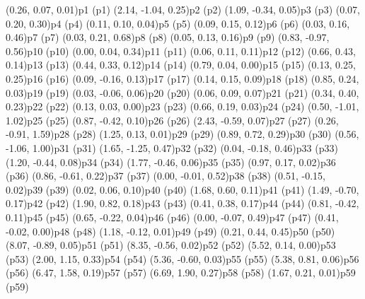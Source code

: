 \psPoint(0.26, 0.07, 0.01){p1}
\psdot(p1)
\psPoint(2.14, -1.04, 0.25){p2}
\psdot(p2)
\psPoint(1.09, -0.34, 0.05){p3}
\psdot(p3)
\psPoint(0.07, 0.20, 0.30){p4}
\psdot(p4)
\psPoint(0.11, 0.10, 0.04){p5}
\psdot(p5)
\psPoint(0.09, 0.15, 0.12){p6}
\psdot(p6)
\psPoint(0.03, 0.16, 0.46){p7}
\psdot(p7)
\psPoint(0.03, 0.21, 0.68){p8}
\psdot(p8)
\psPoint(0.05, 0.13, 0.16){p9}
\psdot(p9)
\psPoint(0.83, -0.97, 0.56){p10}
\psdot(p10)
\psPoint(0.00, 0.04, 0.34){p11}
\psdot(p11)
\psPoint(0.06, 0.11, 0.11){p12}
\psdot(p12)
\psPoint(0.66, 0.43, 0.14){p13}
\psdot(p13)
\psPoint(0.44, 0.33, 0.12){p14}
\psdot(p14)
\psPoint(0.79, 0.04, 0.00){p15}
\psdot(p15)
\psPoint(0.13, 0.25, 0.25){p16}
\psdot(p16)
\psPoint(0.09, -0.16, 0.13){p17}
\psdot(p17)
\psPoint(0.14, 0.15, 0.09){p18}
\psdot(p18)
\psPoint(0.85, 0.24, 0.03){p19}
\psdot(p19)
\psPoint(0.03, -0.06, 0.06){p20}
\psdot(p20)
\psPoint(0.06, 0.09, 0.07){p21}
\psdot(p21)
\psPoint(0.34, 0.40, 0.23){p22}
\psdot(p22)
\psPoint(0.13, 0.03, 0.00){p23}
\psdot(p23)
\psPoint(0.66, 0.19, 0.03){p24}
\psdot(p24)
\psPoint(0.50, -1.01, 1.02){p25}
\psdot(p25)
\psPoint(0.87, -0.42, 0.10){p26}
\psdot(p26)
\psPoint(2.43, -0.59, 0.07){p27}
\psdot(p27)
\psPoint(0.26, -0.91, 1.59){p28}
\psdot(p28)
\psPoint(1.25, 0.13, 0.01){p29}
\psdot(p29)
\psPoint(0.89, 0.72, 0.29){p30}
\psdot(p30)
\psPoint(0.56, -1.06, 1.00){p31}
\psdot(p31)
\psPoint(1.65, -1.25, 0.47){p32}
\psdot(p32)
\psPoint(0.04, -0.18, 0.46){p33}
\psdot(p33)
\psPoint(1.20, -0.44, 0.08){p34}
\psdot(p34)
\psPoint(1.77, -0.46, 0.06){p35}
\psdot(p35)
\psPoint(0.97, 0.17, 0.02){p36}
\psdot(p36)
\psPoint(0.86, -0.61, 0.22){p37}
\psdot(p37)
\psPoint(0.00, -0.01, 0.52){p38}
\psdot(p38)
\psPoint(0.51, -0.15, 0.02){p39}
\psdot(p39)
\psPoint(0.02, 0.06, 0.10){p40}
\psdot(p40)
\psPoint(1.68, 0.60, 0.11){p41}
\psdot(p41)
\psPoint(1.49, -0.70, 0.17){p42}
\psdot(p42)
\psPoint(1.90, 0.82, 0.18){p43}
\psdot(p43)
\psPoint(0.41, 0.38, 0.17){p44}
\psdot(p44)
\psPoint(0.81, -0.42, 0.11){p45}
\psdot(p45)
\psPoint(0.65, -0.22, 0.04){p46}
\psdot(p46)
\psPoint(0.00, -0.07, 0.49){p47}
\psdot(p47)
\psPoint(0.41, -0.02, 0.00){p48}
\psdot(p48)
\psPoint(1.18, -0.12, 0.01){p49}
\psdot(p49)
\psPoint(0.21, 0.44, 0.45){p50}
\psdot(p50)
\psPoint(8.07, -0.89, 0.05){p51}
\psdot(p51)
\psPoint(8.35, -0.56, 0.02){p52}
\psdot(p52)
\psPoint(5.52, 0.14, 0.00){p53}
\psdot(p53)
\psPoint(2.00, 1.15, 0.33){p54}
\psdot(p54)
\psPoint(5.36, -0.60, 0.03){p55}
\psdot(p55)
\psPoint(5.38, 0.81, 0.06){p56}
\psdot(p56)
\psPoint(6.47, 1.58, 0.19){p57}
\psdot(p57)
\psPoint(6.69, 1.90, 0.27){p58}
\psdot(p58)
\psPoint(1.67, 0.21, 0.01){p59}
\psdot(p59)
